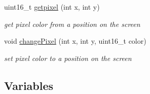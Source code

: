 \begin{DoxyCompactItemize}
uint16\+\_\+t \mbox{\hyperlink{group__video_ga07dd5e8b0cf0aa3aa860a89f4093045b}{getpixel}} (int x, int y)
\begin{DoxyCompactList}\small\item\em get pixel color from a position on the screen \end{DoxyCompactList}\item 
void \mbox{\hyperlink{group__video_gaad3b8372cfabe442562c9c5d6e4db348}{change\+Pixel}} (int x, int y, uint16\+\_\+t color)
\begin{DoxyCompactList}\small\item\em set pixel color to a position on the screen \end{DoxyCompactList}\end{DoxyCompactItemize}
\subsection*{Variables}
